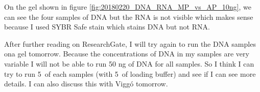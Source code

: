 On the gel shown in figure \ref{fig:20180220_DNA_RNA_MP_vs_AP_10ng}, we can see the four samples of DNA but the RNA is not visible which makes sense because I used SYBR Safe stain which stains DNA but not RNA.


After further reading on ResearchGate, I will try again to run the DNA samples ona gel tomorrow. Because the concentrations of DNA in my samples are very variable I will not be able to run 50 ng of DNA for all samples. So I think I can try to run 5~\uL of each samples (with 5~\uL of loading buffer) and see if I can see more details. I can also discuss this with Viggó tomorrow.
